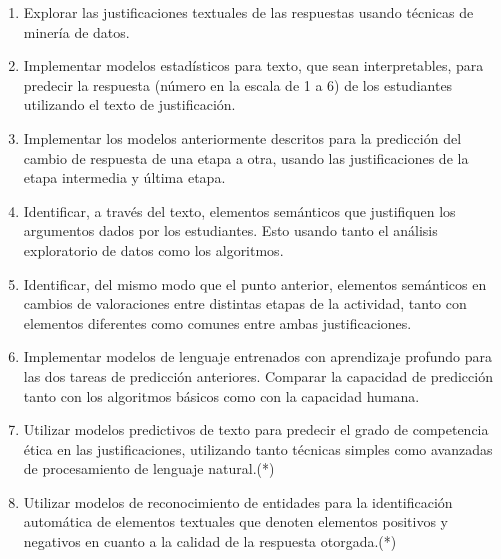 \documentclass[
	spanish, %
	letterpaper, oneside
]{article}
\begin{document}
\begin{enumerate}
    \item Explorar las justificaciones textuales de las respuestas usando técnicas de minería de datos.

    \item Implementar modelos estadísticos para texto, que sean interpretables, para predecir la respuesta (número en la escala de 1 a 6) de los estudiantes utilizando el texto de justificación.


    \item Implementar los modelos anteriormente descritos para la predicción del cambio de respuesta de una etapa a otra, usando las justificaciones de la etapa intermedia y última etapa.

    
    \item Identificar, a través del texto, elementos semánticos que justifiquen los argumentos dados por los estudiantes. Esto usando tanto el análisis exploratorio de datos como los algoritmos.
    
    \item Identificar, del mismo modo que el punto anterior, elementos semánticos en cambios de valoraciones entre distintas etapas de la actividad, tanto con elementos diferentes como comunes entre ambas justificaciones.

    \item Implementar modelos de lenguaje entrenados con aprendizaje profundo para las dos tareas de predicción anteriores. Comparar la capacidad de predicción tanto con los algoritmos básicos como con la capacidad humana.
    
    \item Utilizar modelos predictivos de texto para predecir el grado de competencia ética en las justificaciones, utilizando tanto técnicas simples como avanzadas de procesamiento de lenguaje natural.(*)

    \item Utilizar modelos de reconocimiento de entidades para la identificación automática de elementos textuales que denoten elementos positivos y negativos en cuanto a la calidad de la respuesta otorgada.(*)

\end{enumerate}
\end{document}
